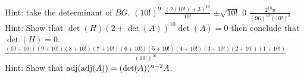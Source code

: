 \begin{Answer}
\Question Hint: take the determinant of $BG$.
\Question $(10!)^9$
\Question $\frac{(2(10!)+3)^{10}}{10!}$
\Question $\pm\sqrt{10!}$
\Question $0$
\Question $\frac{2^{10}\pi}{(96)^{10}(10!)^3}$
\Question Hint: Show that $\det(H)(2+\det(A))^{10}\det(A)=0$ then conclude that $\det(H)=0$.
\Question $\frac{(10+10!)(9+10!)(8+10!)(7+10!)(6+10!)(5+10!)(4+10!)(3+10!)(2+10!)(1+10!)}{(10!)^{10}}$
\Question Hint: Show that $\operatorname{adj}(\operatorname{adj}(A))=(\det(A))^{n-2}A$.
\end{Answer}
